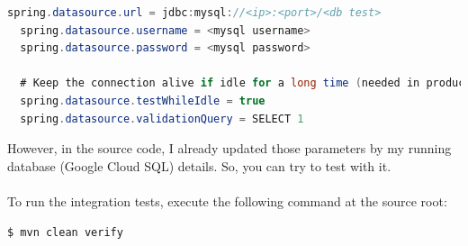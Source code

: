 \documentclass[a4paper,12pt]{article}
\begin{document}
\begin{lstlisting}[language=java]
  spring.datasource.url = jdbc:mysql://<ip>:<port>/<db test>
  spring.datasource.username = <mysql username>
  spring.datasource.password = <mysql password>

  # Keep the connection alive if idle for a long time (needed in production)
  spring.datasource.testWhileIdle = true
  spring.datasource.validationQuery = SELECT 1
\end{lstlisting}
However, in the source code, I already updated those parameters by my running database (Google Cloud SQL) details. So, you can try to test with it.
\\
\\
To run the integration tests, execute the following command at the source root:
\\
\begin{lstlisting}[language=bash]
  $ mvn clean verify
\end{lstlisting}
\end{document}
